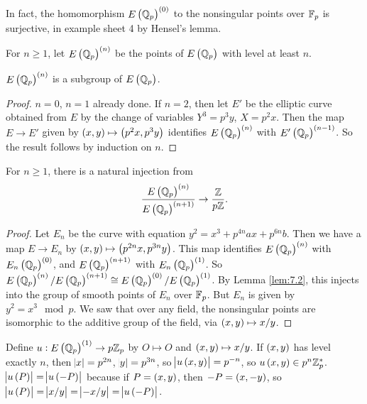 In fact, the homomorphism $ E\br{\Q_p}^{\br{0}} $ to the nonsingular points over $ \mathbb{F}_p $ is surjective, in example sheet 4 by Hensel's lemma.

\pagebreak


For $ n \ge 1 $, let $ E\br{\Q_p}^{\br{n}} $ be the points of $ E\br{\Q_p} $ with level at least $ n $.

\begin{corollary}
$ E\br{\Q_p}^{\br{n}} $ is a subgroup of $ E\br{\Q_p} $.
\end{corollary}

\begin{proof}
$ n = 0 $, $ n = 1 $ already done. If $ n = 2 $, then let $ E' $ be the elliptic curve obtained from $ E $ by the change of variables $ Y^3 = p^3y $, $ X = p^2x $. Then the map $ E \to E' $ given by $ \br{x, y} \mapsto \br{p^2x, p^3y} $ identifies $ E\br{\Q_p}^{\br{n}} $ with $ E'\br{\Q_p}^{\br{n - 1}} $. So the result follows by induction on $ n $.
\end{proof}

\begin{corollary}
For $ n \ge 1 $, there is a natural injection from
$$ \dfrac{E\br{\Q_p}^{\br{n}}}{E\br{\Q_p}^{\br{n + 1}}} \to \dfrac{\Z}{p\Z}. $$
\end{corollary}

\begin{proof}
Let $ E_n $ be the curve with equation $ y^2 = x^3 + p^{4n}ax + p^{6n}b $. Then we have a map $ E \to E_n $ by $ \br{x, y} \mapsto \br{p^{2n}x, p^{3n}y} $. This map identifies $ E\br{\Q_p}^{\br{n}} $ with $ E_n\br{\Q_p}^{\br{0}} $, and $ E\br{\Q_p}^{\br{n + 1}} $ with $ E_n\br{\Q_p}^{\br{1}} $. So $ E\br{\Q_p}^{\br{n}} / E\br{\Q_p}^{\br{n + 1}} \cong E\br{\Q_p}^{\br{0}} / E\br{\Q_p}^{\br{1}} $. By Lemma \ref{lem:7.2}, this injects into the group of smooth points of $ E_n $ over $ \mathbb{F}_p $. But $ E_n $ is given by $ y^2 = x^3 \mod p $. We saw that over any field, the nonsingular points are isomorphic to the additive group of the field, via $ \br{x, y} \mapsto x / y $.
\end{proof}

Define $ u : E\br{\Q_p}^{\br{1}} \to p\Z_p $ by $ O \mapsto O $ and $ \br{x, y} \mapsto x / y $. If $ \br{x, y} $ has level exactly $ n $, then $ \abs{x} = p^{2n} $, $ \abs{y} = p^{3n} $, so $ \abs{u\br{x, y}} = p^{-n} $, so $ u\br{x, y} \in p^n\Z_p^* $. $ \abs{u\br{P}} = \abs{u\br{-P}} $ because if $ P = \br{x, y} $, then $ -P = \br{x, -y} $, so $ \abs{u\br{P}} = \abs{x / y} = \abs{-x / y} = \abs{u\br{-P}} $.

